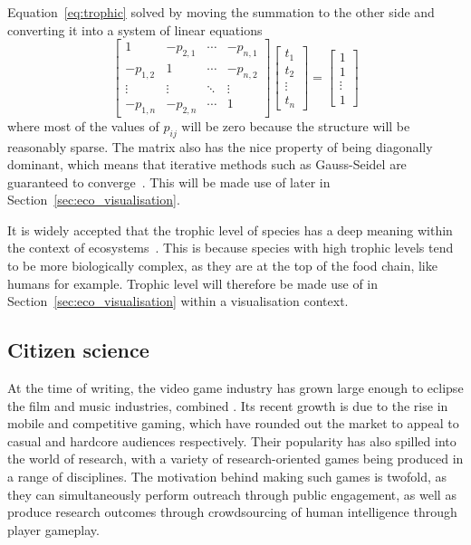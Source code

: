 Equation~\eqref{eq:trophic} solved by moving the summation to the other side and converting it into a system of linear equations
\begin{equation}
    \begin{bmatrix}
    1&-p_{2,1}&\cdots&-p_{n,1}\\
    -p_{1,2}&1&\cdots&-p_{n,2}\\
    \vdots&\vdots&\ddots&\vdots\\
    -p_{1,n}&-p_{2,n}&\cdots&1
    \end{bmatrix}
    \begin{bmatrix}
    t_1\\t_2\\\vdots\\t_n
    \end{bmatrix}
    =
    \begin{bmatrix}
    1\\1\\\vdots\\1
    \end{bmatrix}
\end{equation}
where most of the values of $p_{ij}$ will be zero because the structure will be reasonably sparse.
The matrix also has the nice property of being diagonally dominant, which means that iterative methods such as Gauss-Seidel are guaranteed to converge~\cite{Young2014}. This will be made use of later in Section~\ref{sec:eco_visualisation}.

It is widely accepted that the trophic level of species has a deep meaning within the context of ecosystems~\cite{Post2002, Johnson2014}. This is because species with high trophic levels tend to be more biologically complex, as they are at the top of the food chain, like humans for example. Trophic level will therefore be made use of in Section~\ref{sec:eco_visualisation} within a visualisation context.

\subsection{Citizen science}
\label{sec:citizen_science}
At the time of writing, the video game industry has grown large enough to eclipse the film and music industries, combined \cite{Egenfeldt-Nielsen2019}. Its recent growth is due to the rise in mobile and competitive gaming, which have rounded out the market to appeal to casual and hardcore audiences respectively.
Their popularity has also spilled into the world of research, with a variety of research-oriented games being produced in a range of disciplines. The motivation behind making such games is twofold, as they can simultaneously perform outreach through public engagement, as well as produce research outcomes through crowdsourcing of human intelligence through player gameplay.

